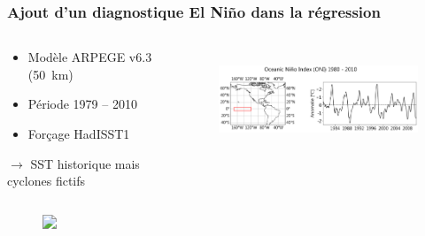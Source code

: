 \documentclass[aspectratio=169, usepdftitle=false, xcolor={dvipsnames}, 9pt,table]{beamer}
\begin{document}
\begin{frame}[t]
    \frametitle{Ajout d'un diagnostique El Niño dans la régression}
    \scriptsize
    \begin{columns}
        \begin{column}{0.38\textwidth}
            \begin{definition}
                \setlength{\leftmargini}{2.5ex}
                \begin{itemize}
                    \item Modèle ARPEGE v6.3 (50~km) \parencite{voldoire_evaluation_2019}
                    \item Période 1979 -- 2010
                    \item Forçage HadISST1
                \end{itemize}
                $\longrightarrow$ SST \alert{historique} mais cyclones \alert{fictifs}
            \end{definition}
        \end{column}
        \begin{column}{0.62\textwidth}
            \vspace{-3em} 
            \begin{figure}[htpb]
                \centering
                \includegraphics[height=3cm]{Figures/ONI.png}
            \end{figure} 
        \end{column}
    \end{columns}
    \vspace{2em}
    \begin{columns}[t]
        \begin{column}{0.6\textwidth}
            \vspace{-3.5em}%
            \begin{figure}
                \includegraphics<2->[height=4.5cm]{Figures/biais_arpege_correlation_oni.png}
            \end{figure}
        \end{column}
        \begin{column}{0.4\textwidth}

\end{column}
\end{columns}
\end{frame}
\end{document}
